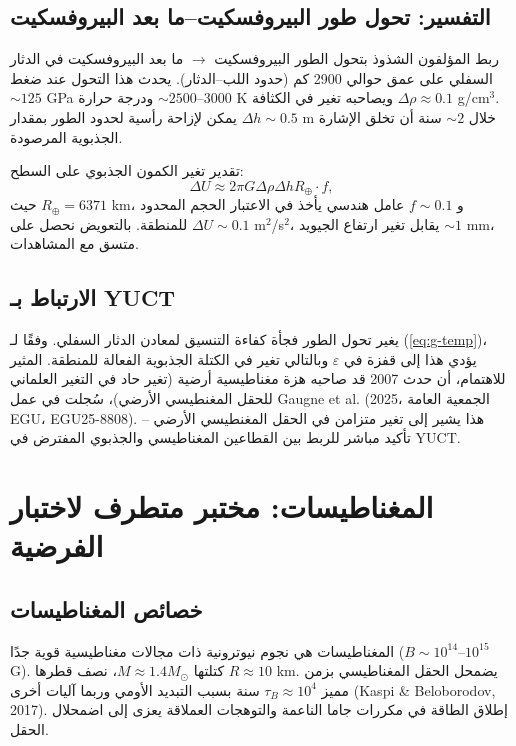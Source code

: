 \documentclass[11pt,a4paper]{article}
\newcommand{\eps}{\varepsilon}
\begin{document}
	\subsection{التفسير: تحول طور البيروفسكيت–ما بعد البيروفسكيت}
	\label{subsec:grace-interpretation}
	
	ربط المؤلفون الشذوذ بتحول الطور البيروفسكيت $\rightarrow$ ما بعد البيروفسكيت في الدثار السفلي على عمق حوالي 2900 كم (حدود اللب–الدثار). يحدث هذا التحول عند ضغط $\sim 125$ GPa ودرجة حرارة $\sim 2500$–$3000$ K ويصاحبه تغير في الكثافة $\Delta\rho \approx 0.1$ g/cm$^3$. يمكن لإزاحة رأسية لحدود الطور بمقدار $\Delta h \sim 0.5$ m خلال $\sim 2$ سنة أن تخلق الإشارة الجذبوية المرصودة.
	
	تقدير تغير الكمون الجذبوي على السطح:
	\begin{equation}
		\Delta U \approx 2\pi G \Delta\rho \Delta h R_\oplus \cdot f,
		\label{eq:delta-u}
	\end{equation}
	حيث $R_\oplus = 6371$ km، و $f \sim 0.1$ عامل هندسي يأخذ في الاعتبار الحجم المحدود للمنطقة. بالتعويض نحصل على $\Delta U \sim 0.1$ m$^2$/s$^2$، يقابل تغير ارتفاع الجيويد $\sim 1$ mm، متسق مع المشاهدات.
	
	\subsection{الارتباط بـ YUCT}
	\label{subsec:grace-yuct}
	
	يغير تحول الطور فجأة كفاءة التنسيق لمعادن الدثار السفلي. وفقًا لـ (\ref{eq:g-temp})، يؤدي هذا إلى قفزة في $\eps$ وبالتالي تغير في الكتلة الجذبوية الفعالة للمنطقة. المثير للاهتمام، أن حدث 2007 قد صاحبه هزة مغناطيسية أرضية (تغير حاد في التغير العلماني للحقل المغنطيسي الأرضي)، سُجلت في عمل Gaugne et al. (2025، الجمعية العامة EGU، EGU25-8808). هذا يشير إلى تغير متزامن في الحقل المغنطيسي الأرضي – تأكيد مباشر للربط بين القطاعين المغناطيسي والجذبوي المفترض في YUCT.
	
	\section{المغناطيسات: مختبر متطرف لاختبار الفرضية}
	\label{sec:magnetars}
	
	\subsection{خصائص المغناطيسات}
	\label{subsec:magnetars-properties}
	
	المغناطيسات هي نجوم نيوترونية ذات مجالات مغناطيسية قوية جدًا ($B \sim 10^{14}$–$10^{15}$ G). كتلتها $M \approx 1.4 M_\odot$، نصف قطرها $R \approx 10$ km. يضمحل الحقل المغناطيسي بزمن مميز $\tau_B \approx 10^4$ سنة بسبب التبديد الأومي وربما آليات أخرى (Kaspi \& Beloborodov, 2017). إطلاق الطاقة في مكررات جاما الناعمة والتوهجات العملاقة يعزى إلى اضمحلال الحقل.
	
\end{document}
